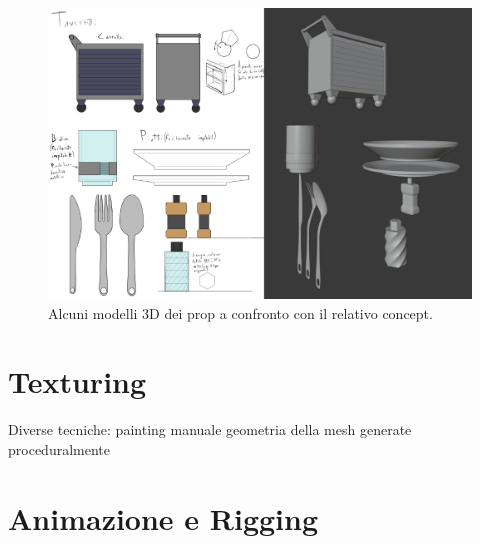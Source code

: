 \begin{figure}
\centering
\includegraphics[width=.8\textwidth]{Figures/props}
\decoRule
\caption[Prop]{Alcuni modelli 3D dei prop a confronto con il relativo concept.}
\label{fig:prop}
\end{figure}

\section{Texturing}
Diverse tecniche:
painting manuale
geometria della mesh
generate proceduralmente

\section{Animazione e Rigging}

